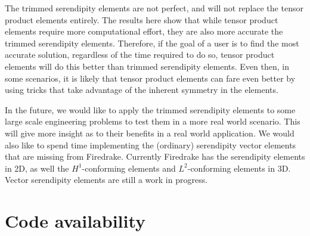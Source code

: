 \documentclass[format=acmsmall,screen,timestamp=false,a4paper]{acmart}
\begin{document}
The trimmed serendipity elements are not perfect, and will not replace the tensor product elements entirely.  The results here show that while tensor product elements require more computational effort, they are also more accurate the trimmed serendipity elements.  Therefore, if the goal of a user is to find the most accurate solution, regardless of the time required to do so, tensor product elements will do this better than trimmed serendipity elements.  Even then, in some scenarios, it is likely that tensor product elements can fare even better by using tricks that take advantage of the inherent symmetry in the elements.  

In the future, we would like to apply the trimmed serendipity elements to some large scale engineering problems to test them in a more real world scenario.  This will give more insight as to their benefits in a real world application.  We would also like to spend time implementing the (ordinary) serendipity vector elements that are  missing from Firedrake.  Currently Firedrake has the serendipity elements in 2D, as well the $H^1$-conforming elements and $L^2$-conforming elements in 3D.  Vector serendipity elements are still a work in progress.




\section*{Code availability}
\end{document}
